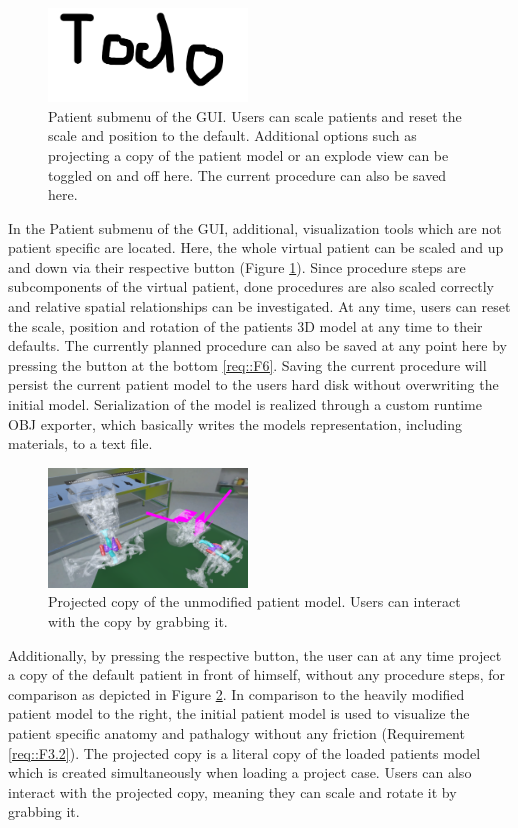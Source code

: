 \begin{figure}[ht]
  \centering
  \includegraphics[width=200px]{images/todo.png}
  \caption{\label{fig::PatientVisualization}Patient submenu of the GUI. Users can scale patients and reset the scale and position to the default. Additional options such as projecting a copy of the patient model or an explode view can be toggled on and off here. The current procedure can also be saved here.}
\end{figure}

In the Patient submenu of the GUI, additional, visualization tools which are not patient specific are located.
Here, the whole virtual patient can be scaled and up and down via their respective button (Figure \ref{fig::PatientVisualization}).
Since procedure steps are subcomponents of the virtual patient, done procedures are also scaled correctly and relative spatial relationships can be investigated. 
At any time, users can reset the scale, position and rotation of the patients 3D model at any time to their defaults.
The currently planned procedure can also be saved at any point here by pressing the button at the bottom \ref{req::F6}.
Saving the current procedure will persist the current patient model to the users hard disk without overwriting the initial model.
Serialization of the model is realized through a custom runtime OBJ exporter, which basically writes the models representation, including materials, to a text file.

\begin{figure}[ht]
  \centering
  \includegraphics[width=200px]{images/implementation/features/visualization/project_copy.png}
  \caption{\label{fig::ProjectCopy} Projected copy of the unmodified patient model. Users can interact with the copy by grabbing it.}
\end{figure}

Additionally, by pressing the respective button, the user can at any time project a copy of the default patient in front of himself, without any procedure steps, for comparison as depicted in Figure \ref{fig::ProjectCopy}.
In comparison to the heavily modified patient model to the right, the initial patient model is used to visualize the patient specific anatomy and pathalogy without any friction (Requirement \ref{req::F3.2}).
The projected copy is a literal copy of the loaded patients model which is created simultaneously when loading a project case.
Users can also interact with the projected copy, meaning they can scale and rotate it by grabbing it.

